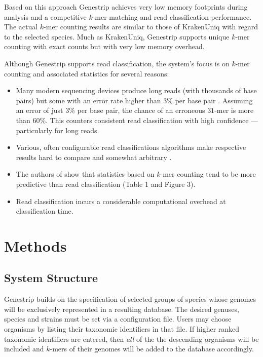 \documentclass[letterpaper,11pt,leqno]{article}
\begin{document}
Based on this approach Genestrip achieves very low memory footprints during analysis and a competitive $k$-mer matching and read classification performance. The actual $k$-mer counting results are similar to those of KrakenUniq \citep{krakenUniq} with regard to the selected species. Much as KrakenUniq, Genestrip supports unique $k$-mer counting with exact counts but with very low memory overhead.

Although Genestrip supports read classification, the system's focus is on $k$-mer counting and associated statistics for several reasons:
\begin{itemize}
	\item Many modern sequencing devices produce long reads (with thousands of base pairs) but some with an error rate higher than 3\% per base pair \citep{nanoporeq, Delahaye:2021up}. Assuming an error of just 3\% per base pair, the chance of an erroneous $31$-mer is more than 60\%. This counters consistent read classification with high confidence --- particularly for long reads.
	\item Various, often configurable read classifications algorithms make respective results hard to compare and somewhat arbitrary \citep{metagenexp}.
	\item The authors of \cite{krakenUniq} show that statistics based on $k$-mer counting tend to be more predictive than read classification (Table 1 and Figure 3).
	\item Read classification incurs a considerable computational overhead at classification time.
\end{itemize}

\section{Methods}\label{methods}

\subsection{System Structure}

Genestrip builds on the specification of selected groups of species whose genomes will be exclusively represented in a resulting database. The desired genuses, species and strains must be set via a configuration file. Users may choose organisms by listing their taxonomic identifiers in that file. If higher ranked taxonomic identifiers are entered, then \emph{all} of the the descending organisms will be included and $k$-mers of their genomes will be added to the database accordingly. 
\end{document}
